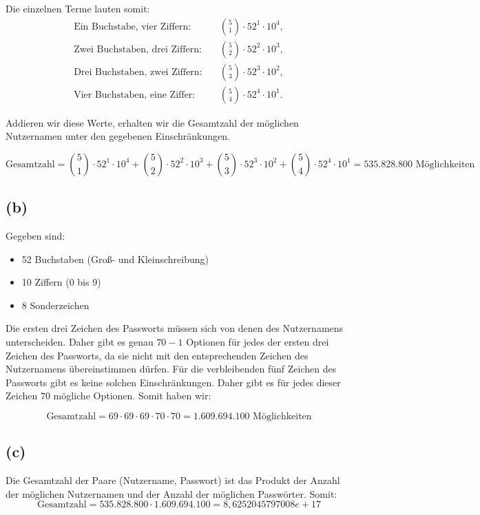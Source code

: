 \documentclass[a4paper]{scrartcl}
\begin{document}
Die einzelnen Terme lauten somit:
\begin{align*}
\text{Ein Buchstabe, vier Ziffern:} & \quad \binom{5}{1} \cdot 52^1 \cdot 10^4, \\
\text{Zwei Buchstaben, drei Ziffern:} & \quad \binom{5}{2} \cdot 52^2 \cdot 10^3, \\
\text{Drei Buchstaben, zwei Ziffern:} & \quad \binom{5}{3} \cdot 52^3 \cdot 10^2, \\
\text{Vier Buchstaben, eine Ziffer:} & \quad \binom{5}{4} \cdot 52^4 \cdot 10^1.
\end{align*}

Addieren wir diese Werte, erhalten wir die Gesamtzahl der möglichen Nutzernamen unter den gegebenen Einschränkungen.

\[
\text{Gesamtzahl} = \binom{5}{1} \cdot 52^1 \cdot 10^4 + \binom{5}{2} \cdot 52^2 \cdot 10^3 + \binom{5}{3} \cdot 52^3 \cdot 10^2 + \binom{5}{4} \cdot 52^4 \cdot 10^1 = 535.828.800 \text{ Möglichkeiten}
\]

\subsection*{(b)}
Gegeben sind: 
\begin{itemize}
    \item 52 Buchstaben (Groß- und Kleinschreibung)
    \item 10 Ziffern (0 bis 9)
    \item 8 Sonderzeichen
\end{itemize}
Die ersten drei Zeichen des Passworts müssen sich von denen des Nutzernamens unterscheiden. Daher gibt es genau $70 - 1$ Optionen für jedes der ersten drei Zeichen des Passworts, da sie nicht mit den entsprechenden Zeichen des Nutzernamens übereinstimmen dürfen.
Für die verbleibenden fünf Zeichen des Passworts gibt es keine solchen Einschränkungen. Daher gibt es für jedes dieser Zeichen $70$ mögliche Optionen.
Somit haben wir:

\[
  \text{Gesamtzahl} = 69 \cdot 69 \cdot 69 \cdot 70 \cdot 70 = 1.609.694.100 \text{ Möglichkeiten}
\]

\subsection*{(c)}
Die Gesamtzahl der Paare (Nutzername, Passwort) ist das Produkt der Anzahl der möglichen Nutzernamen und der Anzahl der möglichen Passwörter.
Somit:
\[
  \text{Gesamtzahl} = 535.828.800 \cdot 1.609.694.100 = 8,6252045797008e+17
\]
\end{document}
